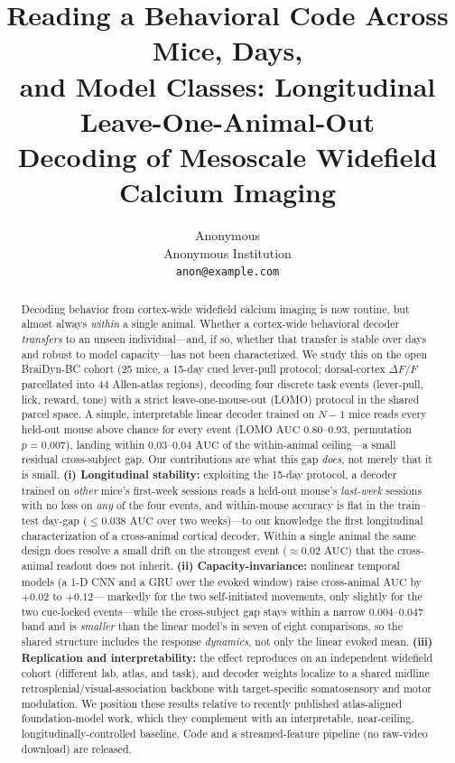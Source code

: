 \documentclass{article}
\title{Reading a Behavioral Code Across Mice, Days,\\
and Model Classes: Longitudinal Leave-One-Animal-Out\\
Decoding of Mesoscale Widefield Calcium Imaging}
\author{Anonymous \\
Anonymous Institution \\
\texttt{anon@example.com}}
\newcommand{\auc}{\mathrm{AUC}}
\begin{document}
\maketitle

\begin{abstract}
Decoding behavior from cortex-wide widefield calcium imaging is now routine, but almost always
\emph{within} a single animal. Whether a cortex-wide behavioral decoder \emph{transfers} to an
unseen individual---and, if so, whether that transfer is stable over days and robust to model
capacity---has not been characterized. We study this on the open BraiDyn-BC cohort (25 mice, a
15-day cued lever-pull protocol; dorsal-cortex $\Delta F/F$ parcellated into 44 Allen-atlas
regions), decoding four discrete task events (lever-pull, lick, reward, tone) with a strict
leave-one-mouse-out (LOMO) protocol in the shared parcel space. A simple, interpretable linear
decoder trained on $N{-}1$ mice reads every held-out mouse above chance for every event
(LOMO $\auc$ $0.80$--$0.93$, permutation $p=0.007$), landing within $0.03$--$0.04$ $\auc$ of the
within-animal ceiling---a small residual cross-subject gap. Our contributions are what this gap
\emph{does}, not merely that it is small. \textbf{(i) Longitudinal stability:} exploiting the
15-day protocol, a decoder trained on \emph{other} mice's first-week sessions reads a held-out
mouse's \emph{last-week} sessions with no loss on \emph{any} of the four events, and within-mouse
accuracy is flat in the train--test day-gap ($\leq 0.038$ $\auc$ over two weeks)---to our knowledge
the first longitudinal characterization of a cross-animal cortical decoder. Within a single animal
the same design does resolve a small drift on the strongest event ($\approx 0.02$ $\auc$) that the
cross-animal readout does not inherit. \textbf{(ii) Capacity-invariance:} nonlinear temporal models
(a 1-D CNN and a GRU over the evoked window) raise cross-animal $\auc$ by $+0.02$ to $+0.12$---
markedly for the two self-initiated movements, only slightly for the two cue-locked events---while
the cross-subject gap stays within a narrow $0.004$--$0.047$ band and is \emph{smaller} than the
linear model's in seven of eight comparisons, so the shared structure includes the response
\emph{dynamics}, not only the linear evoked mean.
\textbf{(iii) Replication and interpretability:} the effect reproduces on an independent
widefield cohort (different lab, atlas, and task), and decoder weights localize to a shared
midline retrosplenial/visual-association backbone with target-specific somatosensory and motor
modulation. We position these results relative to recently published atlas-aligned
foundation-model work, which they complement with an interpretable, near-ceiling,
longitudinally-controlled baseline.
Code and a streamed-feature pipeline (no raw-video download) are released.
\end{abstract}
\end{document}
